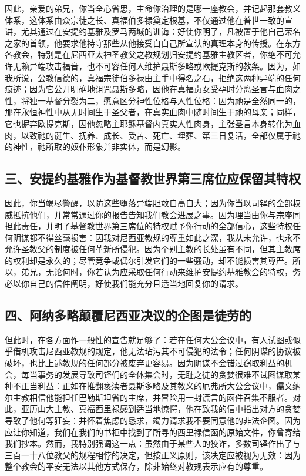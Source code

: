 因此，亲爱的弟兄，你当全心省思，主命你治理的是哪一座教会，并记起那套教义体系，这体系由众宗徒之长、真福伯多禄奠定根基，不仅通过他在普世一致的宣讲，尤其通过在安提约基雅及罗马两城的训诲：好使你明了，凡被置于他自己荣名之家的首领，他要求他持守那些从他接受自自己所宣认的真理本身的传授。在东方各教会，特别是在尼西亚太神圣教父之教规划归安提约基雅主教区者，你绝不可允许无赖异端攻击福音，也不可容任何人维护聂斯多略或欧提克斯的教条。因为，如我所说，公教信德的，真福宗徒伯多禄由主手中得名之石，拒绝这两种异端的任何痕迹；因为它公开明确地诅咒聂斯多略，因他在真福贞女受孕时分离圣言与血肉之性，将独一基督分裂为二，愿意区分神性位格与人性位格：因为祂是全然同一的，那在永恒神性中从无时间生于圣父者，在真实血肉中随时间生于祂的母亲；同样，它也摒弃欧提克斯，因他忽略主耶稣基督内真实人性肉身，主张圣言本身转化为血肉，以致祂的诞生、抚养、成长、受苦、死亡、埋葬、第三日复活，全部仅属于祂的神性，祂所取的奴仆形象并非实体，而是幻影。\par


\subsection{三、安提约基雅作为基督教世界第三席位应保留其特权}

因此，你当竭尽警醒，以防这些堕落异端胆敢自高自大；因为你当以司铎的全部权威抵抗他们，并常常通过你的报告告知我们教会进展之事。因为理当由你与宗座同担此责任，并明了基督教世界第三席位的特权赋予你行动的全部信心，这些特权任何阴谋都不得丝毫损害：因我对尼西亚教规的尊重如此之深，我从未允许，也永不允许圣教父的制度被任何革新所侵犯。因为个别主教的长处虽有不同，但其主教席的权利却是永久的；尽管竞争或偶尔引发它们的一些骚动，却不能损害其尊严。所以，弟兄，无论何时，你若认为应采取任何行动来维护安提约基雅教会的特权，务必以你自己的信件阐明，好使我们能充分且适当地回复你的请求。\par


\subsection{四、阿纳多略颠覆尼西亚决议的企图是徒劳的}

但此时，在各方面作一般性的宣告就足够了：若在任何大公会议中，有人试图或似乎借机攻击尼西亚教规的规定，他无法玷污其不可侵犯的法令；任何阴谋的协议被破坏，也比上述教规的任何部分被废弃更容易。因为阴谋不会错过窃取利益的机会，每当事务的发展导致司铎们的全体集会时，无耻之徒的贪婪很难不试图谋取某种不正当利益：正如在推翻亵渎者聂斯多略及其教义的厄弗所大公会议中，儒文纳尔主教相信他能担任巴勒斯坦省的主席，并冒险用一封谎言的函件召集不服者。对此，亚历山大主教、真福西里禄感到适当地惊愕，他在致我的信中指出对方的贪婪导致了他何等狂妄：并怀着焦虑的恳求，竭力请求我不要同意他的非法企图。因为应让你知道，我们在我们的书柜中找到了所寻的西里禄信函的原始文件，你曾寄给我们抄本。然而，我特别强调这一点：虽然由于某些人的狡诈，多数司铎作出了与三百一十八位教父的规程相悖的决定，但按正义原则，该决定应被视为无效：因为整个教会的平安无法以其他方式保存，除非始终对教规表示应有的尊重。\par

